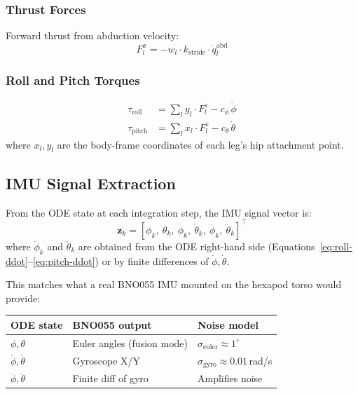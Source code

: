 \documentclass[11pt]{article}
\begin{document}
\subsubsection{Thrust Forces}

Forward thrust from abduction velocity:
\begin{equation}
F_l^x = -w_l \cdot k_{\mathrm{stride}} \cdot \dot{q}_l^{\mathrm{abd}}
\label{eq:thrust}
\end{equation}

\subsubsection{Roll and Pitch Torques}

\begin{align}
\tau_{\mathrm{roll}} &= \sum_l y_l \cdot F_l^z - c_\phi\,\dot\phi \label{eq:roll-torque} \\
\tau_{\mathrm{pitch}} &= \sum_l x_l \cdot F_l^z - c_\theta\,\dot\theta \label{eq:pitch-torque}
\end{align}
where $x_l, y_l$ are the body-frame coordinates of each leg's hip attachment point.

\subsection{IMU Signal Extraction}

From the ODE state at each integration step, the IMU signal vector is:
\begin{equation}
\mathbf{z}_k = [\phi_k,\ \theta_k,\ \dot\phi_k,\ \dot\theta_k,\ \ddot\phi_k,\ \ddot\theta_k]^\top
\label{eq:imu-vector}
\end{equation}
where $\ddot\phi_k$ and $\ddot\theta_k$ are obtained from the ODE right-hand side (Equations~\eqref{eq:roll-ddot}--\eqref{eq:pitch-ddot}) or by finite differences of $\dot\phi, \dot\theta$.

This matches what a real BNO055 IMU mounted on the hexapod torso would provide:
\begin{center}
\begin{tabular}{lll}
\toprule
\textbf{ODE state} & \textbf{BNO055 output} & \textbf{Noise model} \\
\midrule
$\phi, \theta$ & Euler angles (fusion mode) & $\sigma_{\mathrm{euler}} \approx 1^\circ$ \\
$\dot\phi, \dot\theta$ & Gyroscope X/Y & $\sigma_{\mathrm{gyro}} \approx 0.01$\,rad/s \\
$\ddot\phi, \ddot\theta$ & Finite diff of gyro & Amplifies noise \\
\bottomrule
\end{tabular}
\end{center}
\end{document}
